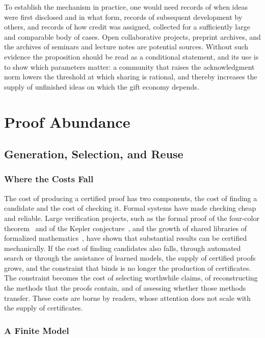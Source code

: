 \documentclass[11pt]{book}
\theoremstyle{definition}
\theoremstyle{remark}
\begin{document}
To establish the mechanism in practice, one would need records of when ideas were first disclosed and in what form, records of subsequent development by others, and records of how credit was assigned, collected for a sufficiently large and comparable body of cases. Open collaborative projects, preprint archives, and the archives of seminars and lecture notes are potential sources. Without such evidence the proposition should be read as a conditional statement, and its use is to show which parameters matter: a community that raises the acknowledgment norm lowers the threshold at which sharing is rational, and thereby increases the supply of unfinished ideas on which the gift economy depends.

\part{Proof Abundance}

\chapter{Generation, Selection, and Reuse}

\section{Where the Costs Fall}

The cost of producing a certified proof has two components, the cost of finding a candidate and the cost of checking it. Formal systems have made checking cheap and reliable. Large verification projects, such as the formal proof of the four-color theorem~\cite{gonthier} and of the Kepler conjecture~\cite{hales}, and the growth of shared libraries of formalized mathematics~\cite{mathlib}, have shown that substantial results can be certified mechanically. If the cost of finding candidates also falls, through automated search or through the assistance of learned models, the supply of certified proofs grows, and the constraint that binds is no longer the production of certificates. The constraint becomes the cost of selecting worthwhile claims, of reconstructing the methods that the proofs contain, and of assessing whether those methods transfer. These costs are borne by readers, whose attention does not scale with the supply of certificates.

\section{A Finite Model}
\end{document}
